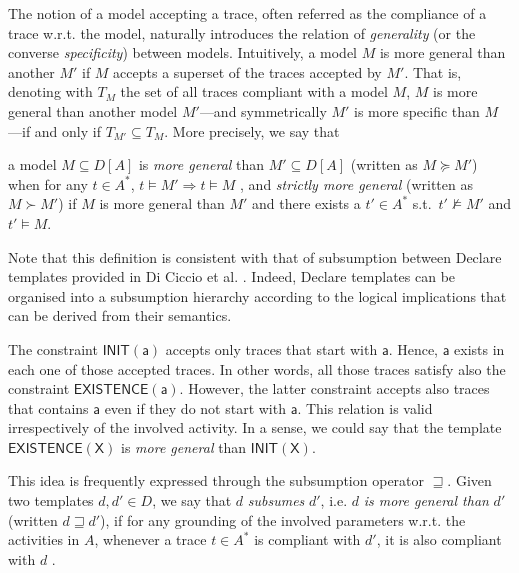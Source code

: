  The notion of a model accepting a trace, often referred as the compliance of a trace w.r.t. the model, naturally introduces the relation of \emph{generality} (or the converse \emph{specificity}) between models.
%
Intuitively, a model $M$ is more general than another $M'$ if $M$ accepts a superset of the traces accepted by $M'$. That is, denoting with $T_M$ the set of all traces compliant with a model $M$, $M$ is more general than another model $M'$---and symmetrically $M'$ is more specific than $M$---if and only if $T_{M'} \subseteq T_M$. 
%
More precisely, we say that 
\theoremstyle{definition}\label{def:generality}
\begin{definition}{}
a model $M\subseteq D[A]$ is \emph{more general} than $M'\subseteq D[A]$ (written as $M \succeq M'$) when for any $t\in A^*$, $t\models M' \Rightarrow t\models M$ , and \emph{strictly more general} (written as $M \succ M'$) if $M$ is more general than $M'$ and there exists a $t'\in A^*$ s.t.\ $t'\not\models M'$ and $t'\models M$.
\end{definition}

Note that this definition is consistent with that of subsumption between Declare templates provided in Di Ciccio et al. \cite{2017-DiCiccio}. Indeed, Declare templates can be organised into a subsumption hierarchy according to the logical implications that can be derived from their semantics.
%
\begin{example}{}
The constraint $\mathsf{INIT(a)}$ accepts only traces that start with $\mathsf{a}$. Hence, $\mathsf{a}$ exists in each one of those accepted traces. In other words, all those traces satisfy also the constraint $\mathsf{EXISTENCE(a)}$. However, the latter constraint accepts also traces that contains $\mathsf{a}$ even if they do not start with $\mathsf{a}$. This relation is valid irrespectively of the involved activity. In a sense, we could say that the template $\mathsf{EXISTENCE(X)}$ is \emph{more general} than $\mathsf{INIT(X)}$.
\end{example}
This idea is frequently expressed through the subsumption operator $\sqsupseteq$. Given two templates $d, d' \in D$, we say that $d$ \emph{subsumes} $d'$, i.e. $d$ \emph{is more general than} $d'$ (written $d\sqsupseteq d'$), if for any grounding of the involved parameters w.r.t. the activities in $A$, whenever a trace $t \in A^*$ is compliant with $d'$, it is also compliant with $d$ \cite{2017-DiCiccio} .


